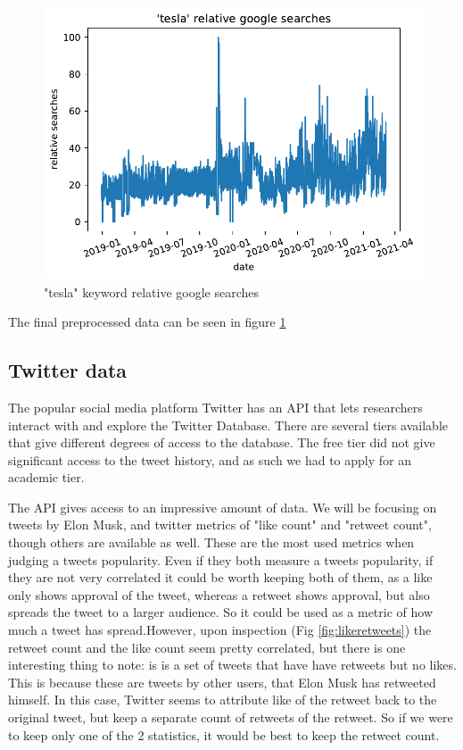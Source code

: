 \begin{figure}[h]
	\centering
	\includegraphics[width=\textwidth]{img/img_GT_tesla.pdf}
	\caption{"tesla" keyword relative google searches}
	\label{fig:GT_tesla}
\end{figure}

The final preprocessed data can be seen in figure \ref{fig:GT_tesla}

\subsection{Twitter data}
The popular social media platform Twitter has an \Gls{API} that lets researchers interact with and explore the Twitter Database. There are several tiers available that give different degrees of access to the database. The free tier did not give significant access to the tweet history, and as such we had to apply for an academic tier.

The \Gls{API} gives access to an impressive amount of data. We will be focusing on tweets by Elon Musk, and twitter metrics of "like count" and "retweet count", though others are available as well. These are the most used metrics when judging a tweets popularity.
Even if they both measure a tweets popularity, if they are not very correlated it could be worth keeping both of them, as a like only shows approval of the tweet, whereas a retweet shows approval, but also spreads the tweet to a larger audience. So it could be used as a metric of how much a tweet has spread.However, upon inspection (Fig  \ref{fig:likeretweets}) the retweet count and the like count seem pretty correlated, but there is one interesting thing to note: is is a set of tweets that have have retweets but no likes. This is because these are tweets by other users, that Elon Musk has retweeted himself. In this case, Twitter seems to attribute like of the retweet back to the original tweet, but keep a separate count of retweets of the retweet. So if we were to keep only one of the 2 statistics, it would be best to keep the retweet count.

